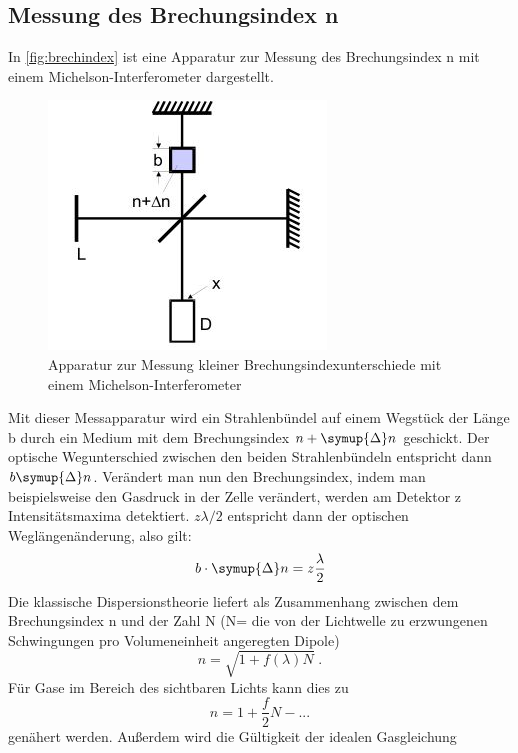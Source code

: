 \subsection{Messung des Brechungsindex n}
In \autoref{fig:brechindex} ist eine Apparatur zur Messung des Brechungsindex n mit einem Michelson-Interferometer dargestellt.
\begin{figure}[H]
    \centering
    \includegraphics{graphics/brechindex.JPG}
    \caption{Apparatur zur Messung kleiner Brechungsindexunterschiede mit einem
    Michelson-Interferometer \cite{anleitung}}
    \label{fig:brechindex}
    \end{figure}
    \noindent
Mit dieser Messapparatur wird ein Strahlenbündel auf einem Wegstück der Länge b durch ein Medium mit dem Brechungsindex $n+\symup{\Delta} n$ geschickt. Der optische Wegunterschied zwischen den beiden Strahlenbündeln entspricht dann $b\symup{\Delta} n$.
Verändert man nun den Brechungsindex, indem man beispielsweise den Gasdruck in der Zelle verändert, werden am Detektor z Intensitätsmaxima detektiert. $z\lambda/2$ entspricht dann der optischen Weglängenänderung, also gilt: 
    \begin{equation}
        \label{eqn:brechungsindexa}
        b \cdot \symup{\Delta} n = z \frac{\lambda}{2}    
    \end{equation}
    \noindent
Die klassische Dispersionstheorie liefert als Zusammenhang zwischen dem Brechungsindex n und der Zahl N (N= die von der Lichtwelle zu erzwungenen Schwingungen pro Volumeneinheit angeregten Dipole) 
\begin{equation}
    n = \sqrt{1 + f(\lambda)N} \; .
\end{equation}
Für Gase im Bereich des sichtbaren Lichts kann dies zu 
\begin{equation}
    \label{eqn:nae}
    n = 1 + \frac{f}{2} N- ... 
\end{equation}
genähert werden. Außerdem wird die Gültigkeit der idealen Gasgleichung
